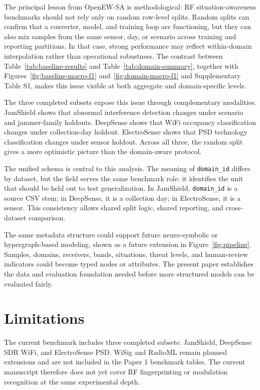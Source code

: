 \documentclass[11pt]{article}
\newcommand{\artifact}[1]{\texttt{#1}}
\begin{document}
The principal lesson from OpenEW-SA is methodological: RF situation-awareness benchmarks should not rely only on random row-level splits. Random splits can confirm that a converter, model, and training loop are functioning, but they can also mix samples from the same sensor, day, or scenario across training and reporting partitions. In that case, strong performance may reflect within-domain interpolation rather than operational robustness. The contrast between Table~\ref{tab:baseline-results} and Table~\ref{tab:domain-summary}, together with Figures~\ref{fig:baseline-macro-f1} and~\ref{fig:domain-macro-f1} and Supplementary Table S1, makes this issue visible at both aggregate and domain-specific levels.

The three completed subsets expose this issue through complementary modalities. JamShield shows that abnormal interference detection changes under scenario and jammer-family holdouts. DeepSense shows that WiFi occupancy classification changes under collection-day holdout. ElectroSense shows that PSD technology classification changes under sensor holdout. Across all three, the random split gives a more optimistic picture than the domain-aware protocol.

The unified schema is central to this analysis. The meaning of \artifact{domain\_id} differs by dataset, but the field serves the same benchmark role: it identifies the unit that should be held out to test generalization. In JamShield, \artifact{domain\_id} is a source CSV stem; in DeepSense, it is a collection day; in ElectroSense, it is a sensor. This consistency allows shared split logic, shared reporting, and cross-dataset comparison.

The same metadata structure could support future neuro-symbolic or hypergraph-based modeling, shown as a future extension in Figure~\ref{fig:pipeline}. Samples, domains, receivers, bands, situations, threat levels, and human-review indicators could become typed nodes or attributes. The present paper establishes the data and evaluation foundation needed before more structured models can be evaluated fairly.

\section{Limitations}

The current benchmark includes three completed subsets: JamShield, DeepSense SDR WiFi, and ElectroSense PSD. WiSig and RadioML remain planned extensions and are not included in the Paper 1 benchmark tables. The current manuscript therefore does not yet cover RF fingerprinting \cite{hanna2022wisig,coreslab2022wisigDataset} or modulation recognition \cite{oshea2016convolutionalRadioModulation,deepsig2016radioml2016a} at the same experimental depth.
\end{document}
